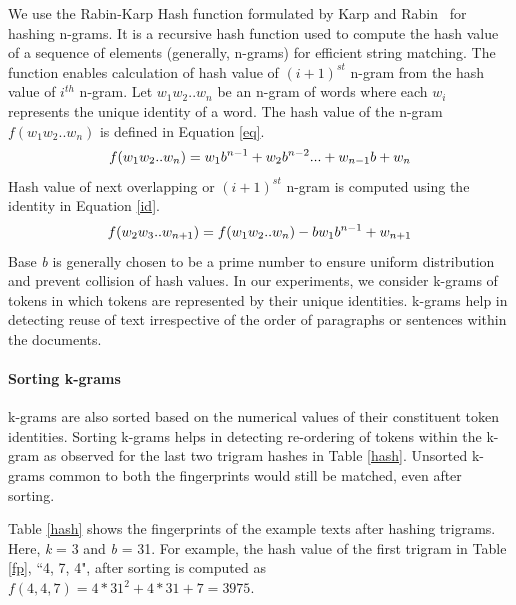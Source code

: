 \documentclass[11pt]{article}
\begin{document}
We use the Rabin-Karp Hash function formulated by Karp and Rabin~ for hashing n-grams. It is a recursive hash function used to compute the hash value of a sequence of elements (generally, n-grams) for efficient string matching. The function enables calculation of hash value of $(i+1)^{st}$ n-gram from the hash value of $i^{th}$ n-gram. Let $w_{1}w_{2}..w_{n}$ be an n-gram of words where each $w_{i}$ represents the unique identity of a word. The hash value of the n-gram $f(w_{1}w_{2}..w_{n})$ is defined in Equation \ref{eq}.
\begin{equation}   \label{eq}
\small
f(w_{1}w_{2}..w_{n}) = w_{1}b^{n-1} + w_{2}b^{n-2}... + w_{n-1}b + w_{n}
\end{equation}  
Hash value of next overlapping or $(i+1)^{st}$ n-gram is computed using the identity in Equation  \ref{id}.
\begin{equation}   \label{id}
\small
f(w_{2}w_{3}..w_{n+1}) = f(w_{1}w_{2}..w_{n}) - bw_{1}b^{n-1} + w_{n+1}
\end{equation}  
Base {\em  b} is generally chosen to be a prime number to ensure uniform distribution and prevent collision of hash values. In our experiments, we consider k-grams of tokens in which tokens are represented by their unique identities. k-grams help in detecting reuse of text irrespective of the order of paragraphs or sentences within the documents.

\paragraph{Sorting k-grams}  k-grams are also sorted based on the numerical values of their constituent token identities. Sorting k-grams helps in detecting re-ordering of tokens within the k-gram as observed for the last two trigram hashes in Table \ref{hash}. Unsorted k-grams common to both the fingerprints would still be matched, even after sorting.

Table \ref{hash} shows the fingerprints of the example texts after hashing trigrams. Here, {\em k} = 3 and {\em b} = 31. For example, the hash value of the first trigram in Table \ref{fp}, ``4, 7, 4", after sorting is computed as $f(4, 4, 7) = 4*31^{2} + 4*31 + 7 = 3975$.
\end{document}
